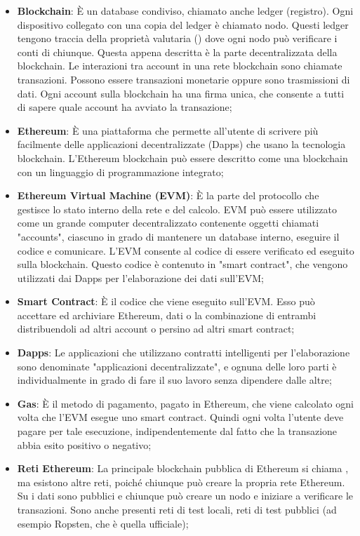 \begin{itemize}
\item \textbf{Blockchain}: È un database condiviso, chiamato anche ledger (registro). Ogni dispositivo collegato con una copia del ledger è chiamato nodo. Questi ledger tengono traccia della proprietà valutaria () dove ogni nodo può verificare i conti di chiunque. Questa appena descritta \`e la parte decentralizzata della blockchain. Le interazioni tra account in una rete blockchain sono chiamate transazioni. Possono essere transazioni monetarie oppure sono trasmissioni di dati. Ogni account sulla blockchain ha una firma unica, che consente a tutti di sapere quale account ha avviato la transazione;
\item \textbf{Ethereum}: È una piattaforma che permette all'utente di scrivere più facilmente delle applicazioni decentralizzate (Dapps) che usano la tecnologia blockchain. L'Ethereum blockchain può essere descritto come una blockchain con un linguaggio di programmazione integrato;
\item \textbf{Ethereum Virtual Machine (EVM)}: È la parte del protocollo che gestisce lo stato interno della rete e del calcolo. EVM può essere utilizzato come un grande computer decentralizzato contenente oggetti chiamati "accounts", ciascuno in grado di mantenere un database interno, eseguire il codice e comunicare. L'EVM consente al codice di essere verificato ed eseguito sulla blockchain. Questo codice è contenuto in "smart contract", che vengono utilizzati dai Dapps per l'elaborazione dei dati sull'EVM;
\item \textbf{Smart Contract}: È il codice che viene eseguito sull'EVM. Esso può accettare ed archiviare Ethereum, dati o la combinazione di entrambi distribuendoli ad altri account o persino ad altri smart contract;
\item \textbf{Dapps}: Le applicazioni che utilizzano contratti intelligenti per l'elaborazione sono denominate "applicazioni decentralizzate", e ognuna delle loro parti \`e individualmente in grado di fare il suo lavoro senza dipendere dalle altre;
\item \textbf{Gas}: È il metodo di pagamento, pagato in  Ethereum, che viene calcolato ogni volta che l'EVM esegue uno smart contract. Quindi ogni volta l'utente deve pagare per tale esecuzione, indipendentemente dal fatto che la transazione abbia esito positivo o negativo;
\item \textbf{Reti Ethereum}: La principale blockchain pubblica di Ethereum si chiama , ma esistono altre reti, poiché chiunque può creare la propria rete Ethereum. Su  i dati sono pubblici e chiunque può creare un nodo e iniziare a verificare le transazioni. Sono anche presenti reti di test locali, reti di test pubblici (ad esempio Ropsten, che è quella ufficiale);

\end{itemize}

